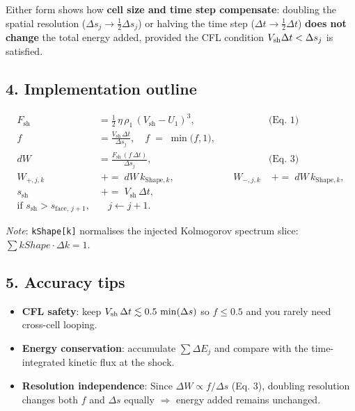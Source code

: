 Either form shows how \textbf{cell size and time step compensate}:
doubling the spatial resolution ($\Delta s_j \to \tfrac{1}{2} \Delta s_j$) or halving the time step ($\Delta t \to \tfrac{1}{2} \Delta t$) \textbf{does not change} the total energy added, provided the CFL condition $V_{\rm sh} \Delta t < \Delta s_j$ is satisfied.

\subsection*{4. Implementation outline}

\begin{align}
F_{\mathrm{sh}} 
  &= \tfrac12\,\eta\,\rho_1\,(V_{\mathrm{sh}} - U_1)^3, 
    &&\text{(Eq.~1)}\\
f 
  &= \frac{V_{\mathrm{sh}}\,\Delta t}{\Delta s_j}, 
    \quad f \;=\; \min\!\bigl(f,1\bigr),\\
dW 
  &= \frac{F_{\mathrm{sh}}\,(f\,\Delta t)}{\Delta s_j}, 
    &&\text{(Eq.~3)}\\
W_{+,j,k} 
  &\;+=\; dW\,k_{\mathrm{Shape},k}, 
&\quad
W_{-,j,k} 
  &\;+=\; dW\,k_{\mathrm{Shape},k},\\
s_{\mathrm{sh}} 
  &\;+=\; V_{\mathrm{sh}}\,\Delta t,\\
\text{if }s_{\mathrm{sh}} > s_{\mathrm{face},\,j+1},
  &\quad j \leftarrow j + 1.
\end{align}


\noindent
\emph{Note}: \verb|kShape[k]| normalises the injected Kolmogorov spectrum slice: $\sum kShape \cdot \Delta k = 1$.

\subsection*{5. Accuracy tips}
\begin{itemize}
  \item \textbf{CFL safety}: keep $V_{\rm sh}\,\Delta t \lesssim 0.5\,\min(\Delta s)$ so $f \le 0.5$ and you rarely need cross-cell looping.
  \item \textbf{Energy conservation}: accumulate $\sum \Delta E_j$ and compare with the time-integrated kinetic flux at the shock.
  \item \textbf{Resolution independence}: Since $\Delta W \propto f / \Delta s$ (Eq. 3), doubling resolution changes both $f$ and $\Delta s$ equally $\Rightarrow$ energy added remains unchanged.
\end{itemize}

